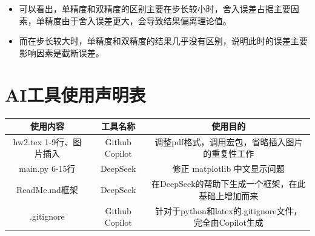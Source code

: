 \documentclass[UTF8]{ctexart}
\begin{document}
\begin{itemize}
    \item 可以看出，单精度和双精度的区别主要在步长较小时，舍入误差占据主要因素，单精度由于舍入误差更大，会导致结果偏离理论值。
    \item 而在步长较大时，单精度和双精度的结果几乎没有区别，说明此时的误差主要影响因素是截断误差。
\end{itemize}

\newpage
\appendix
\section{AI工具使用声明表}
\begin{table}[H]
    \centering
    \begin{tabular}{c|c|c}
        \hline
        使用内容 & 工具名称 & 使用目的 \\ \hline
        hw2.tex 1-9行、图片插入 & Github Copilot & 调整pdf格式，调用宏包，省略插入图片的重复性工作 \\ 
        main.py 6-15行 & DeepSeek & 修正 matplotlib 中文显示问题 \\ 
        ReadMe.md框架 & DeepSeek & 在DeepSeek的帮助下生成一个框架，在此基础上增加而来 \\
        .gitignore & Github Copilot & 针对于python和latex的.gitignore文件，完全由Copilot生成  
    \end{tabular}
    \label{tab:AI_tools}
\end{table}
\end{document}
